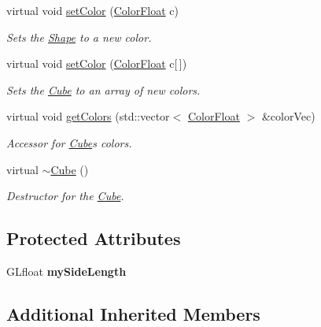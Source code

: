 \begin{DoxyCompactItemize}
virtual void \hyperlink{classtsgl_1_1_cube_a4eb42afdc453fa0c768924a26e5cd870}{set\+Color} (\hyperlink{structtsgl_1_1_color_float}{Color\+Float} c)
\begin{DoxyCompactList}\small\item\em Sets the \hyperlink{classtsgl_1_1_shape}{Shape} to a new color. \end{DoxyCompactList}\item 
virtual void \hyperlink{classtsgl_1_1_cube_a28111319d350040165bd24d92342c7cc}{set\+Color} (\hyperlink{structtsgl_1_1_color_float}{Color\+Float} c\mbox{[}$\,$\mbox{]})
\begin{DoxyCompactList}\small\item\em Sets the \hyperlink{classtsgl_1_1_cube}{Cube} to an array of new colors. \end{DoxyCompactList}\item 
virtual void \hyperlink{classtsgl_1_1_cube_ac1d31d18439024e4160db369df463a7d}{get\+Colors} (std\+::vector$<$ \hyperlink{structtsgl_1_1_color_float}{Color\+Float} $>$ \&color\+Vec)
\begin{DoxyCompactList}\small\item\em Accessor for \hyperlink{classtsgl_1_1_cube}{Cube}\textquotesingle{}s colors. \end{DoxyCompactList}\item 
\mbox{\label{classtsgl_1_1_cube_a79c8e76f768ea5cae794c3f856a56280}} 
virtual \hyperlink{classtsgl_1_1_cube_a79c8e76f768ea5cae794c3f856a56280}{$\sim$\+Cube} ()
\begin{DoxyCompactList}\small\item\em Destructor for the \hyperlink{classtsgl_1_1_cube}{Cube}. \end{DoxyCompactList}\end{DoxyCompactItemize}
\subsection*{Protected Attributes}
\begin{DoxyCompactItemize}
\item 
\mbox{\label{classtsgl_1_1_cube_a1800477d53c864fa2819435285e27669}} 
G\+Lfloat {\bfseries my\+Side\+Length}
\end{DoxyCompactItemize}
\subsection*{Additional Inherited Members}


